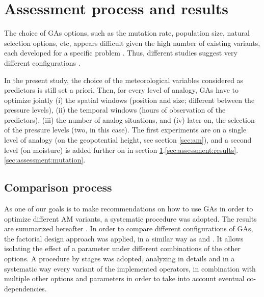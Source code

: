 \documentclass{ametsoc}
\begin{document}
\section{Assessment process and results}
\label{sec:assessment}

The choice of GAs options, such as the mutation rate, population size, natural selection options, etc, appears difficult given the high number of existing variants, each developed for a specific problem \citep{Haupt2004, Costa2007a}. Thus, different studies suggest very different configurations \citep{DeJong1975a, Grefenstette1986, Back1996a, Back1996b}.

In the present study, the choice of the meteorological variables considered as predictors is still set a priori. Then, for every level of analogy, GAs have to optimize jointly (i) the spatial windows (position and size; different between the pressure levels), (ii) the temporal windows (hours of observation of the predictors), (iii) the number of analog situations, and (iv) later on, the selection of the pressure levels (two, in this case). The first experiments are on a single level of analogy (on the geopotential height, see section \ref{sec:am}), and a second level (on moisture) is added further on in section \ref{sec:assessment}.\ref{sec:assessment:results}.\ref{sec:assessment:mutation}.


\subsection{Comparison process}

As one of our goals is to make recommendations on how to use GAs in order to optimize different AM variants, a systematic procedure was adopted. The results are summarized hereafter \citep[see][for the details]{Horton2012a}. In order to compare different configurations of GAs, the factorial design approach was applied, in a similar way as \citet{Costa2005a,Costa2007a} and \citet{Mariano2010a}. It allows isolating the effect of a parameter under different combinations of the other options. A procedure by stages was adopted, analyzing in details and in a systematic way every variant of the implemented operators, in combination with multiple other options and parameters in order to take into account eventual co-dependencies.
\end{document}
